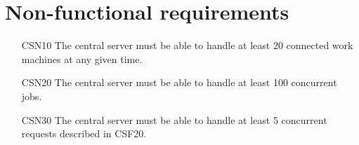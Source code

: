 \section{Non-functional requirements}
\begin{enumerate}
  \item[CSN10] The central server must be able to handle at least 20 connected work machines at any given time.
  \item[CSN20] The central server must be able to handle at least 100 concurrent jobs.
  \item[CSN30] The central server must be able to handle at least 5 concurrent requests described in CSF20.
\end{enumerate}
